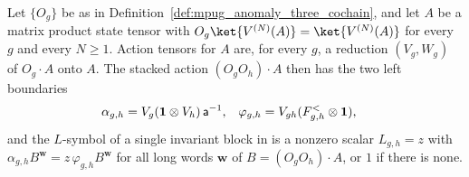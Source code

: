 \begin{definition}
    \label{def:mpug_single_block_l_symbol}
    \leanok
    Let $\{O_g\}$ be as in Definition~\ref{def:mpug_anomaly_three_cochain},
    and let $A$ be a matrix product state tensor with
    $O_g\ket{V^{(N)}(A)}=\ket{V^{(N)}(A)}$ for every $g$ and every $N\geq1$.
    Action tensors for $A$ are, for every $g$, a reduction $(V_g,W_g)$ of
    $O_g\cdot A$ onto $A$. The stacked action $(O_gO_h)\cdot A$ then has the
    two left boundaries
    \begin{align}
        \alpha_{g,h}  & =V_g(\mathbf 1\otimes V_h)\,\mathsf a^{-1}, &
        \varphi_{g,h} & =V_{gh}(F^<_{g,h}\otimes\mathbf 1),
        \notag
    \end{align}
    and the $L$-symbol of a single invariant block in
    \cite{FrancoRubio2025MPUGauging} is a nonzero scalar $L_{g,h}=z$ with
    $\alpha_{g,h}B^{\mathbf w}=z\,\varphi_{g,h}B^{\mathbf w}$ for all long
    words $\mathbf w$ of $B=(O_gO_h)\cdot A$, or $1$ if there is none.
\end{definition}

